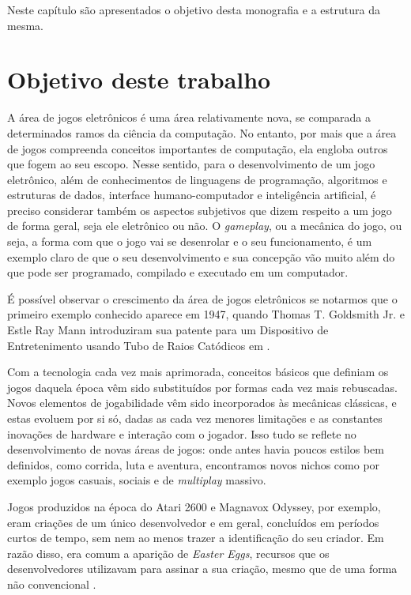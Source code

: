 \documentclass[brazil]{abnt}
\begin{document}
Neste capítulo são apresentados o objetivo desta monografia e a estrutura da mesma.
\newpage


\section{Objetivo deste trabalho}

A área de jogos eletrônicos é uma área relativamente nova, se comparada a determinados ramos da ciência da computação. No entanto, por mais que a área de jogos compreenda conceitos importantes de computação, ela engloba outros que fogem ao seu escopo. Nesse sentido, para o desenvolvimento de um jogo eletrônico, além de conhecimentos de linguagens de programação, algoritmos e estruturas de dados, interface humano-computador e inteligência artificial, é preciso considerar também os aspectos subjetivos que dizem respeito a um jogo de forma geral, seja ele eletrônico ou não. O \textit{gameplay}, ou a mecânica do jogo, ou seja, a forma com que o jogo vai se desenrolar e o seu funcionamento, é um exemplo claro de que o seu desenvolvimento e sua concepção vão muito além do que pode ser programado, compilado e executado em um computador.

É possível observar o crescimento da área de jogos eletrônicos se notarmos que o primeiro exemplo conhecido aparece em 1947, quando Thomas T. Goldsmith Jr. e Estle Ray Mann introduziram sua patente para um Dispositivo de Entretenimento usando Tubo de Raios Catódicos em \cite{2455992}.

Com a tecnologia cada vez mais aprimorada, conceitos básicos que definiam os jogos daquela época vêm sido substituídos por formas cada vez mais rebuscadas. Novos elementos de jogabilidade vêm sido incorporados às mecânicas clássicas, e estas evoluem por si só, dadas as cada vez menores limitações e as constantes inovações de hardware e interação com o jogador. Isso tudo se reflete no desenvolvimento de novas áreas de jogos: onde antes havia poucos estilos bem definidos, como corrida, luta e aventura, encontramos novos nichos como por exemplo jogos casuais, sociais e de \textit{multiplay} massivo.

Jogos produzidos na época do Atari 2600 e Magnavox Odyssey, por exemplo, eram criações de um único desenvolvedor e em geral, concluídos em períodos curtos de tempo, sem nem ao menos trazer a identificação do seu criador. Em razão disso, era comum a aparição de \textit{Easter Eggs}, recursos que os desenvolvedores utilizavam para assinar a sua criação, mesmo que de uma forma não convencional \cite{PrimeiroDevName}.
\end{document}
